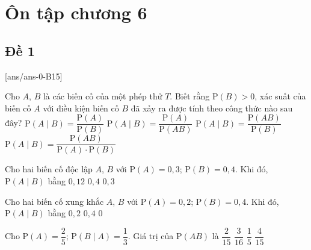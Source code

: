 \section{Ôn tập chương 6}
\subsection{Đề 1}
[ans/ans-0-B15]
\caulc
\begin{ex}%
	Cho $A$, $B$ là các biến cố của một phép thử $T$. Biết rằng $\mathrm{P}(B)>0$, xác suất của biến cố $A$ với điều kiện biến cố $B$ đã xảy ra được tính theo công thức nào sau đây?
	\choice
	{$\mathrm{P}(A\mid B)=\dfrac{\mathrm{P}(A)}{\mathrm{P}(B)}$}
	{$\mathrm{P}(A\mid B)=\dfrac{\mathrm{P}(A)}{\mathrm{P}(A B)}$}
	{\True $\mathrm{P}(A\mid B)=\dfrac{\mathrm{P}(A B)}{\mathrm{P}(B)}$}
	{$\mathrm{P}(A\mid B)=\dfrac{\mathrm{P}(A B)}{\mathrm{P}(A) \cdot \mathrm{P}(B)}$}
\end{ex}
\begin{ex}%
	Cho hai biến cố độc lập $A$, $B$ với $\mathrm{P}(A)=0{,}3$; $\mathrm{P}(B)=0{,}4$. Khi đó, $\mathrm{P}(A\mid B)$ bằng
	{$0{,}12$}
	{$0{,}4$}
	{\True $0{,}3$}
\end{ex}
\begin{ex}%
	Cho hai biến cố xung khắc $A$, $B$ với $\mathrm{P}(A)=0{,}2$; $\mathrm{P}(B)=0{,}4$. Khi đó, $\mathrm{P}(A\mid B)$ bằng
	{$0{,}2$}
	{$0{,}4$}
	{\True $0$}
\end{ex}
\begin{ex}%
	Cho $\mathrm{P}(A)=\dfrac{2}{5}$; $\mathrm{P}\left( B\mid A\right)=\dfrac{1}{3}$. Giá trị của $\mathrm{P}(AB)$ là 
	\choice
	{\True $\dfrac{2}{15} $}
	{$ \dfrac{3}{16}$}
	{$ \dfrac{1}{5}$}
	{$ \dfrac{4}{15}$}
\end{ex}
